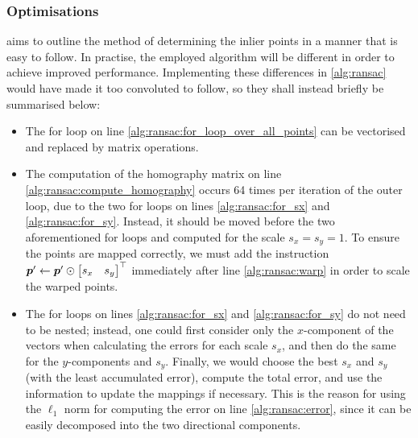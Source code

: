 \documentclass[../main.tex]{subfiles}
\begin{document}
\subsubsection{Optimisations}
 aims to outline the method of determining the inlier points in a manner that is easy to follow.
In practise, the employed algorithm will be different in order to achieve improved performance.
Implementing these differences in \cref{alg:ransac} would have made it too convoluted to follow, so they shall instead briefly be summarised below:
\begin{itemize}
    \item The for loop on line \ref{alg:ransac:for_loop_over_all_points} can be vectorised and replaced by matrix operations.
    \item The computation of the homography matrix on line \ref{alg:ransac:compute_homography} occurs 64 times per iteration of the outer loop, due to the two for loops on lines \ref{alg:ransac:for_sx} and \ref{alg:ransac:for_sy}.
        Instead, it should be moved before the two aforementioned for loops and computed for the scale $s_x=s_y=1$.
        To ensure the points are mapped correctly, we must add the instruction ${\bm{p}}' \gets {\bm{p}}' \odot \begin{bmatrix}
            s_x & s_y
        \end{bmatrix}^\top$ immediately after line \ref{alg:ransac:warp} in order to scale the warped points.
    \item The for loops on lines \ref{alg:ransac:for_sx} and \ref{alg:ransac:for_sy} do not need to be nested; instead, one could first consider only the $x$-component of the vectors when calculating the errors for each scale $s_x$, and then do the same for the $y$-components and $s_y$.
        Finally, we would choose the best $s_x$ and $s_y$ (with the least accumulated error), compute the total error, and use the information to update the mappings if necessary.
        This is the reason for using the $\ell_1$ norm for computing the error on line \ref{alg:ransac:error}, since it can be easily decomposed into the two directional components.
\end{itemize}
\end{document}
